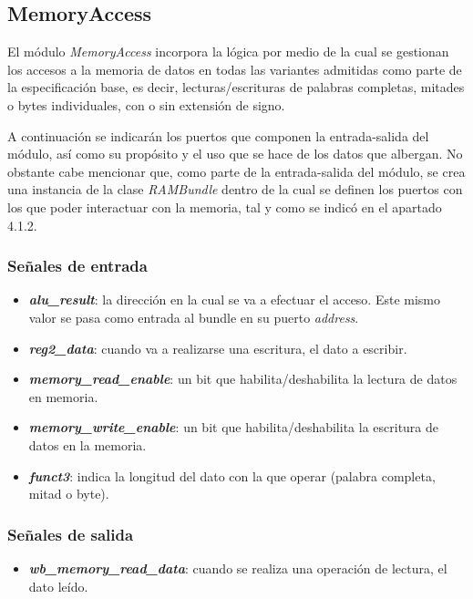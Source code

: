 \subsection{MemoryAccess}

El módulo \textit{MemoryAccess} incorpora la lógica por medio de la cual se gestionan los accesos a la memoria de datos en todas las variantes admitidas como parte de la especificación base, es decir, lecturas/escrituras de palabras completas, mitades o bytes individuales, con o sin extensión de signo.

A continuación se indicarán los puertos que componen la entrada-salida del módulo, así como su propósito y el uso que se hace de los datos que albergan. No obstante cabe mencionar que, como parte de la entrada-salida del módulo, se crea una instancia de la clase \textit{RAMBundle} dentro de la cual se definen los puertos con los que poder interactuar con la memoria, tal y como se indicó en el apartado 4.1.2.

\subsubsection{Señales de entrada}

\begin{itemize}
  \item \textbf{\textit{alu\_result}}: la dirección en la cual se va a efectuar el acceso. Este mismo valor se pasa como entrada al bundle en su puerto \textit{address}.
  \item \textbf{\textit{reg2\_data}}: cuando va a realizarse una escritura, el dato a escribir.
  \item \textbf{\textit{memory\_read\_enable}}: un bit que habilita/deshabilita la lectura de datos en memoria.
  \item \textbf{\textit{memory\_write\_enable}}: un bit que habilita/deshabilita la escritura de datos en la memoria.
  \item \textbf{\textit{funct3}}: indica la longitud del dato con la que operar (palabra completa, mitad o byte).
\end{itemize}

\subsubsection{Señales de salida}

\begin{itemize}
  \item \textbf{\textit{wb\_memory\_read\_data}}: cuando se realiza una operación de lectura, el dato leído.
\end{itemize}

